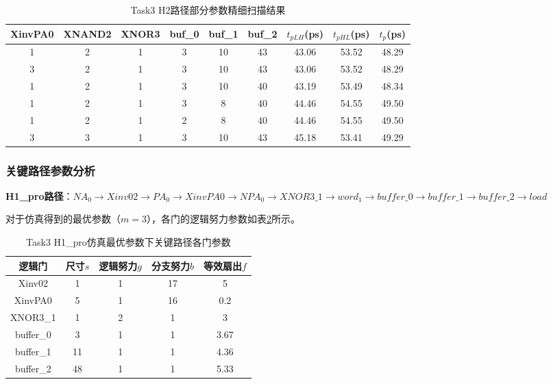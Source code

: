 \documentclass[UTF8,12pt,a4paper]{ctexart}
\begin{document}
\begin{table}[htbp]
\centering
\caption{Task3 H2路径部分参数精细扫描结果}
\label{tab:task3_h2_data}
\begin{tabular}{|c|c|c|c|c|c|c|c|c|}
\hline
XinvPA0 & XNAND2 & XNOR3 & buf\_0 & buf\_1 & buf\_2 & $t_{pLH}$(ps) & $t_{pHL}$(ps) & $t_p$(ps) \\
\hline
1 & 2 & 1 & 3 & 10 & 43 & 43.06 & 53.52 & 48.29 \\
3 & 2 & 1 & 3 & 10 & 43 & 43.06 & 53.52 & 48.29 \\
1 & 2 & 1 & 3 & 10 & 40 & 43.19 & 53.49 & 48.34 \\
1 & 2 & 1 & 3 & 8 & 40 & 44.46 & 54.55 & 49.50 \\
1 & 2 & 1 & 2 & 8 & 40 & 44.46 & 54.55 & 49.50 \\
3 & 3 & 1 & 3 & 10 & 43 & 45.18 & 53.41 & 49.29 \\
\hline
\end{tabular}
\end{table}

\subsubsection{关键路径参数分析}

\textbf{H1\_pro路径}：$NA_0 \rightarrow Xinv02 \rightarrow PA_0 \rightarrow XinvPA0 \rightarrow NPA_0 \rightarrow XNOR3\_1 \rightarrow word_1 \rightarrow buffer\_0 \rightarrow buffer\_1 \rightarrow buffer\_2 \rightarrow load$

对于仿真得到的最优参数（$m=3$），各门的逻辑努力参数如表\ref{tab:task3_h1pro_sim_params}所示。

\begin{table}[htbp]
\centering
\caption{Task3 H1\_pro仿真最优参数下关键路径各门参数}
\label{tab:task3_h1pro_sim_params}
\begin{tabular}{|c|c|c|c|c|}
\hline
逻辑门 & 尺寸$s$ & 逻辑努力$g$ & 分支努力$b$ & 等效扇出$f$ \\
\hline
Xinv02 & 1 & 1 & 17 & 5 \\
XinvPA0 & 5 & 1 & 16 & 0.2 \\
XNOR3\_1 & 1 & 2 & 1 & 3 \\
buffer\_0 & 3 & 1 & 1 & 3.67 \\
buffer\_1 & 11 & 1 & 1 & 4.36 \\
buffer\_2 & 48 & 1 & 1 & 5.33 \\
\hline
\end{tabular}
\end{table}
\end{document}
